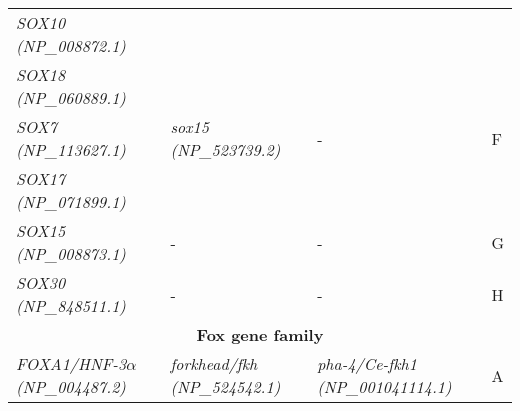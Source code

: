 \documentclass[../main.tex]{subfiles}
\begin{document}
\begin{longtable}{llll}
	\textit{SOX10 (NP\_008872.1)}                           &                                                                                                        &                                                                                                    &                       \\ [0.2cm]
	\textit{SOX18 (NP\_060889.1)}                           & \multirow{3}{*}{\textit{sox15 (NP\_523739.2)}}                                                         & \multirow{3}{*}{-}                                                                                 & \multirow{3}{*}{F}    \\
	\textit{SOX7 (NP\_113627.1)}                            &                                                                                                        &                                                                                                    &                       \\
	\textit{SOX17 (NP\_071899.1)}                           &                                                                                                        &                                                                                                    &                       \\ [0.2cm]
	\textit{SOX15 (NP\_008873.1)}                           & -                                                                                                      & -                                                                                                  & G                     \\ [0.1cm]
	\textit{SOX30 (NP\_848511.1)}                           & -                                                                                                      & -                                                                                                  & H                     \\* \midrule
	\multicolumn{4}{c}{\textbf{Fox gene family}}                                                                                                                                                                                                                                                  \\* \midrule \midrule
	\textit{FOXA1/HNF-3$\alpha$ (NP\_004487.2)}             & \multirow{3}{*}{\textit{forkhead/fkh (NP\_524542.1)}}                                                  & \multirow{3}{*}{\textit{pha-4/Ce-fkh1 (NP\_001041114.1)}}                                          & \multirow{3}{*}{A}    \\

\end{longtable}
\end{document}
